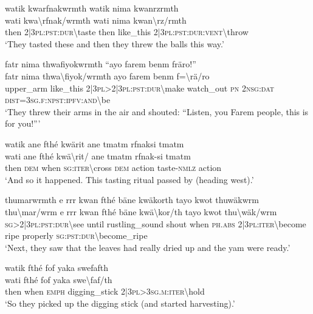 \ea\label{ex:1:a3833}
watik kwarfnakwrmth watik nima kwanrzrmth\\
\gll wati	kwa{\textbackslash}rfnak/wrmth	wati	nima	kwan{\textbackslash}rz/rmth\\
     then	2|3\textsc{pl}:\textsc{pst}:\textsc{dur}{\textbackslash}taste	then	like\_this	2|3\textsc{pl}:\textsc{pst}:\textsc{dur}:\textsc{vent}{\textbackslash}throw\\
\glt `They tasted these and then they threw the balls this way.'
\z

\ea\label{ex:1:a3835}
fatr nima thwafiyokwrmth ``ayo farem benm fräro!''\\
\gll fatr	nima	thwa{\textbackslash}fiyok/wrmth	ayo	farem	benm	f={\textbackslash}rä/ro\\
     upper\_arm	like\_this	2|3\textsc{pl}>2|3\textsc{pl}:\textsc{pst}:\textsc{dur}{\textbackslash}make	watch\_out	\textsc{pn}	2\textsc{nsg}:\textsc{dat}	\textsc{dist}=3\textsc{sg}.\textsc{f}:\textsc{npst}:\textsc{ipfv}:\textsc{and}{\textbackslash}be\\
\glt `They threw their arms in the air and shouted: ``Listen, you Farem people, this is for you!'''
\z

\ea\label{ex:1:a3838}
watik ane fthé kwärit ane tmatm rfnaksi tmatm\\
\gll wati	ane	fthé	kwä{\textbackslash}rit/	ane	tmatm	rfnak-si	tmatm\\
     then	\textsc{dem}	when	\textsc{sg}:\textsc{iter}{\textbackslash}cross	\textsc{dem}	action	taste-\textsc{nmlz}	action\\
\glt `And so it happened. This tasting ritual passed by (heading west).'
\z

\ea\label{ex:1:a3841}
thumarwrmth e rrr kwan fthé bäne kwäkorth tayo kwot thuwäkwrm\\
\gll thu{\textbackslash}mar/wrm e	rrr	kwan	fthé	bäne	kwä{\textbackslash}kor/th	tayo	kwot	thu{\textbackslash}wäk/wrm\\
     \textsc{sg}>2|3\textsc{pl}:\textsc{pst}:\textsc{dur}{\textbackslash}see	until	rustling\_sound	shout	when	\textsc{ph}.\textsc{abs}	2|3\textsc{pl}:\textsc{iter}{\textbackslash}become	ripe	properly	\textsc{sg}:\textsc{pst}:\textsc{dur}{\textbackslash}become\_ripe\\
\glt `Next, they saw that the leaves had really dried up and the yam were ready.'
\z

\ea\label{ex:1:a3842}
watik fthé fof yaka swefafth\\
\gll wati	fthé	fof	yaka	swe{\textbackslash}faf/th\\
     then	when	\textsc{emph}	digging\_stick	2|3\textsc{pl}>3\textsc{sg}.\textsc{m}:\textsc{iter}{\textbackslash}hold\\
\glt `So they picked up the digging stick (and started harvesting).'
\z

